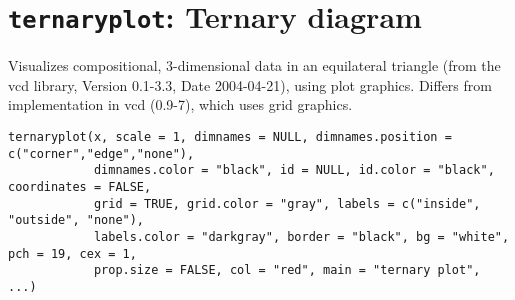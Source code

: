  \section{{\tt ternaryplot}: Ternary diagram}\label{ss:ternaryplot}
\begin{Description}\relax
Visualizes compositional, 3-dimensional data in an equilateral triangle  
(from the vcd library, Version 0.1-3.3, Date 2004-04-21), using plot graphics.  
Differs from implementation in vcd (0.9-7), which uses grid graphics.
\end{Description}
\begin{Usage}
\begin{verbatim}
ternaryplot(x, scale = 1, dimnames = NULL, dimnames.position = c("corner","edge","none"),
            dimnames.color = "black", id = NULL, id.color = "black", coordinates = FALSE,
            grid = TRUE, grid.color = "gray", labels = c("inside", "outside", "none"),
            labels.color = "darkgray", border = "black", bg = "white", pch = 19, cex = 1,
            prop.size = FALSE, col = "red", main = "ternary plot", ...)
\end{verbatim}
\end{Usage}
